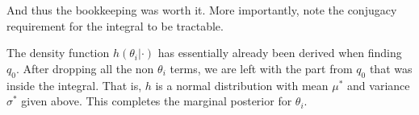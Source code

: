 \documentclass[12pt]{article}
\begin{document}
\noindent And thus the bookkeeping was worth it. More importantly, note the conjugacy requirement for the integral to be tractable.

The density function $h(\theta_i|\cdot)$ has essentially already been derived when finding $q_0$. After dropping all the non $\theta_i$ terms, we are left with the part from $q_0$ that was inside the integral. That is, $h$ is a normal distribution with mean $\mu^*$ and variance $\sigma^*$ given above. This completes the marginal posterior for $\theta_i$.






\end{document}
